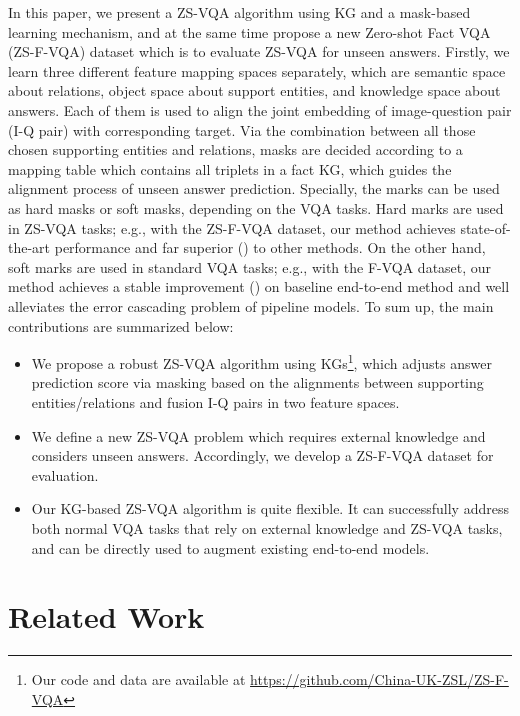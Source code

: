 \documentclass[runningheads]{llncs}
\newcommand{\cjy}[1]{{\color{black}#1}}
\newcommand{\jeff}[1]{{\color{black}#1}}
\begin{document}
\cjy{In this paper, we present a ZS-VQA algorithm using KG and a mask-based learning mechanism, and at the same time propose a new Zero-shot Fact VQA (ZS-F-VQA) dataset which is to evaluate ZS-VQA for unseen answers. }
\jeff{Firstly, we} learn three different feature mapping spaces separately, which are semantic space about \jeff{relations}, object space about support \jeff{entities}, and knowledge space about \jeff{answers}. Each of them is used to align the joint embedding of image-question pair (I-Q pair) with corresponding target.
Via the combination between all those chosen supporting entities and relations, masks are decided according to a mapping table which contains all triplets in \jeff{a} fact KG, \jeff{which guides} 
the alignment process of unseen answer prediction. 
Specially,
\jeff{the marks can be used as hard masks or soft masks, depending on the VQA tasks.} 
\jeff{Hard marks are used in ZS-VQA tasks; e.g., with the  ZS-F-VQA  dataset,} 
our method achieves state-of-the-art performance and far superior () to other methods.
\jeff{On the other hand, soft marks are used in standard VQA tasks; e.g., with the F-VQA dataset, } 
our method achieves a stable improvement () on baseline end-to-end method and well \cjy{alleviates} the error cascading problem of pipeline models.
\jeff{To sum up, } the main contributions are summarized below:
\begin{itemize}
    \item We propose a \cjy{robust ZS-VQA algorithm using KGs\footnote{\jeff{Our} code and data are available at
\url{https://github.com/China-UK-ZSL/ZS-F-VQA}}}, which adjusts answer prediction score via masking based on the alignments between supporting \jeff{entities/relations} and fusion I-Q pairs in two feature spaces. 
    \item \cjy{We define a new ZS-VQA problem which requires external knowledge and considers unseen answers.
    Accordingly, we develop a ZS-F-VQA dataset for evaluation.}
    \item \cjy{Our KG-based ZS-VQA algorithm is quite flexible. It can successfully address both normal VQA tasks that rely on external knowledge and ZS-VQA tasks, and can be directly used to augment existing end-to-end models.}
\end{itemize}
\section{Related Work} 
\end{document}
